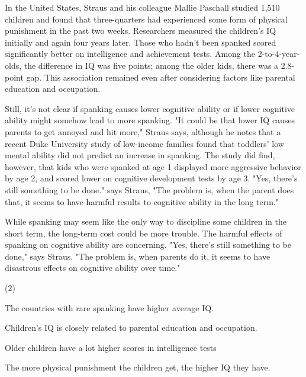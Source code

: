 \documentclass{英语试卷}
\begin{document}
\par In the United States, Straus and his colleague Mallie Paschall studied 1,510 children and found that three-quarters had experienced some form of physical punishment in the past two weeks. Researchers measured the children's IQ initially and again four years later. Those who hadn't been spanked scored significantly better on intelligence and achievement tests. Among the 2-to-4-year-olds, the difference in IQ was five points; among the older kids, there was a 2.8-point gap. This association remained even after considering factors like parental education and occupation.\par
\par Still, it's not clear if spanking causes lower cognitive ability or if lower cognitive ability might somehow lead to more spanking. "It could be that lower IQ causes parents to get annoyed and hit more," Straus says, although he notes that a recent Duke University study of low-income families found that toddlers' low mental ability did not predict an increase in spanking. The study did find, however, that kids who were spanked at age 1 displayed more aggressive behavior by age 2, and scored lower on cognitive development tests by age 3. "Yes, there's still something to be done." says Straus, "The problem is, when the parent does that, it seems to have harmful results to cognitive ability in the long term."\par
\par While spanking may seem like the only way to discipline some children in the short term, the long-term cost could be more trouble. The harmful effects of spanking on cognitive ability are concerning. "Yes, there's still something to be done," says Straus. "The problem is, when parents do it, it seems to have disastrous effects on cognitive ability over time."\par
{}
\begin{choices}(2)
  \item The countries with rare spanking have higher average IQ.
  \item Children's IQ is closely related to parental education and occupation.
  \item Older children have a lot higher scores in intelligence tests
  \item The more physical punishment the children get, the higher IQ they have.
\end{choices}
\end{document}
